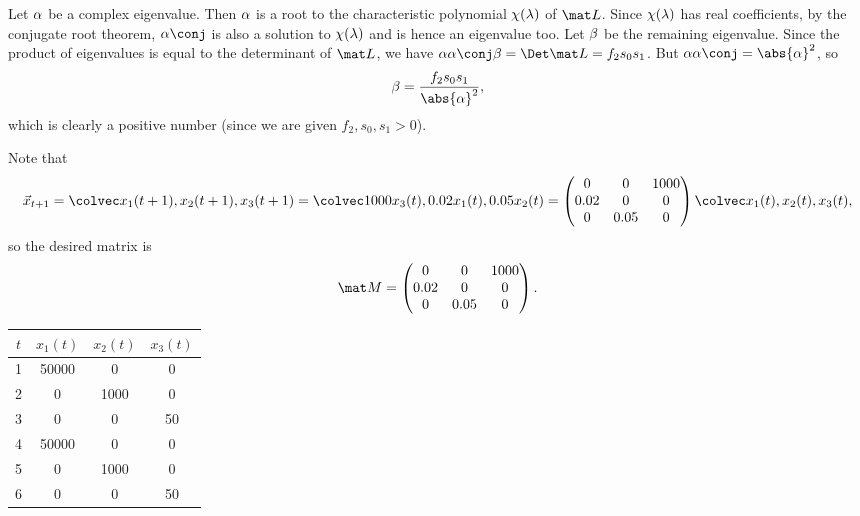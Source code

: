 \begin{solution}
    \begin{ppart}
        Let $\alpha$ be a complex eigenvalue. Then $\alpha$ is a root to the characteristic polynomial $\chi(\lambda)$ of $\mat L$. Since $\chi(\lambda)$ has real coefficients, by the conjugate root theorem, $\a\conj$ is also a solution to $\chi(\lambda)$ and is hence an eigenvalue too. Let $\beta$ be the remaining eigenvalue. Since the product of eigenvalues is equal to the determinant of $\mat L$, we have $\a \a \conj \b = \Det \mat L = f_2 s_0 s_1$. But $\a \a\conj = \abs{\a}^2$, so \[\b = \frac{f_2 s_0 s_1}{\abs{\a}^2},\] which is clearly a positive number (since we are given $f_2, s_0, s_1 > 0$).
    \end{ppart}
    \begin{ppart}
        \begin{psubpart}
            Note that \[\vec x_{t+1} = \cveciii{x_1(t+1)}{x_2(t+1)}{x_3(t+1)} = \cveciii{1000x_3(t)}{0.02x_1(t)}{0.05x_2(t)} = \begin{pmatrix}0 & 0 & 1000 \\ 0.02 & 0 & 0 \\ 0 & 0.05 & 0 \end{pmatrix}\cveciii{x_1(t)}{x_2(t)}{x_3(t)},\] so the desired matrix is \[\mat M = \begin{pmatrix}0 & 0 & 1000 \\ 0.02 & 0 & 0 \\ 0 & 0.05 & 0 \end{pmatrix}.\]
        \end{psubpart}
        \begin{psubpart}
            \begin{table}[H]
                \centering
                \begin{tabular}{|c|c|c|c|}
                \hline
                $t$ & $x_1(t)$ & $x_2(t)$ & $x_3(t)$ \\ \hline
                1 & 50000 & 0 & 0 \\ \hline
                2 & 0 & 1000 & 0 \\ \hline
                3 & 0 & 0 & 50 \\ \hline
                4 & 50000 & 0 & 0 \\ \hline
                5 & 0 & 1000 & 0 \\ \hline
                6 & 0 & 0 & 50 \\ \hline
                \end{tabular}
            \end{table}

\end{psubpart}
\end{ppart}
\end{solution}
